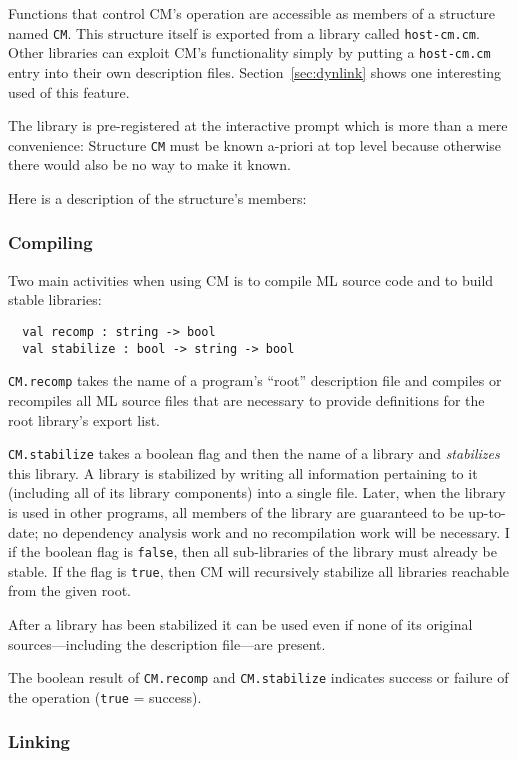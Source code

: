 \documentclass{article}
\begin{document}
Functions that control CM's operation are accessible as members of a
structure named {\tt CM}.  This structure itself is exported from a
library called {\tt host-cm.cm}.  Other libraries can exploit CM's
functionality simply by putting a {\tt host-cm.cm} entry into their
own description files.  Section~\ref{sec:dynlink} shows one
interesting used of this feature.

The library is pre-registered at the interactive prompt which is more
than a mere convenience: Structure {\tt CM} must be known a-priori at
top level because otherwise there would also be no way to make it known.

Here is a description of the structure's members:

\subsubsection*{Compiling}

Two main activities when using CM is to compile ML source code and to
build stable libraries:

\begin{verbatim}
  val recomp : string -> bool
  val stabilize : bool -> string -> bool
\end{verbatim}

{\tt CM.recomp} takes the name of a program's ``root'' description
file and compiles or recompiles all ML source files that are necessary
to provide definitions for the root library's export list.

{\tt CM.stabilize} takes a boolean flag and then the name of a library
and {\em stabilizes} this library.  A library is stabilized by writing
all information pertaining to it (including all of its library
components) into a single file.  Later, when the library is used in
other programs, all members of the library are guaranteed to be
up-to-date; no dependency analysis work and no recompilation work will
be necessary.  I if the boolean flag is {\tt false}, then all
sub-libraries of the library must already be stable.  If the flag is
{\tt true}, then CM will recursively stabilize all libraries reachable
from the given root.

After a library has been stabilized it can be used even if none of its
original sources---including the description file---are present.

The boolean result of {\tt CM.recomp} and {\tt CM.stabilize} indicates
success or failure of the operation ({\tt true} = success).

\subsubsection*{Linking}
\end{document}
